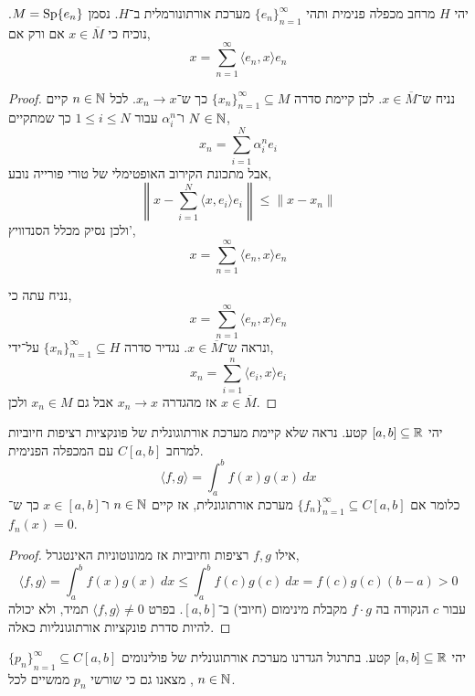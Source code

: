 \question{}
יהי $H$ מרחב מכפלה פנימית ותהי ${\{ e_n \}}_{n = 1}^\infty$ מערכת אורתונורמלית ב־$H$.
נסמן $M = \operatorname{Sp} \{ e_n \}$.
נוכיח כי $x \in \overline{M}$ אם ורק אם,
\[
	x
	= \sum_{n = 1}^\infty \langle e_n, x \rangle e_n
\]
\begin{proof}
	נניח ש־$x \in \overline{M}$.
	לכן קיימת סדרה ${\{ x_n \}}_{n = 1}^\infty \subseteq M$ כך ש־$x_n \to x$.
	לכל $n \in \mathbb{N}$ קיים $N \in \mathbb{N}$ ו־$\alpha_i^n$ עבור $1 \le i \le N$ כך שמתקיים,
	\[
		x_n
		= \sum_{i = 1}^N \alpha_i^n e_i
	\]
	אבל מתכונת הקירוב האופטימלי של טורי פורייה נובע,
	\[
		\left\lVert x - \sum_{i = 1}^N \langle x, e_i \rangle e_i \right\rVert
		\le \lVert x - x_n \rVert
	\]
	ולכן נסיק מכלל הסנדוויץ',
	\[
		x = \sum_{n = 1}^\infty \langle e_n, x \rangle e_n
	\]

	נניח עתה כי,
	\[
		x = \sum_{n = 1}^\infty \langle e_n, x \rangle e_n
	\]
	ונראה ש־$x \in \overline{M}$.
	נגדיר סדרה ${\{ x_n \}}_{n = 1}^\infty \subseteq H$ על־ידי,
	\[
		x_n = \sum_{i = 1}^n \langle e_i, x \rangle e_i
	\]
	אז מהגדרה $x_n \to x$ אבל גם $x_n \in M$ ולכן $x \in \overline{M}$.
\end{proof}

\question{}
יהי $[a, b] \subseteq \mathbb{R}$ קטע.
נראה שלא קיימת מערכת אורתוגונלית של פונקציות רציפות חיוביות למרחב $C[a, b]$ עם המכפלה הפנימית.
\[
	\langle f, g \rangle
	= \int_{a}^{b} f(x) g(x)\ dx
\]
כלומר אם ${\{ f_n \}}_{n = 1}^\infty \subseteq C[a, b]$ מערכת אורתוגונלית,
אז קיים $n \in \mathbb{N}$ ו־$x \in [a, b]$ כך ש־$f_n(x) = 0$.
\begin{proof}
	אילו $f, g$ רציפות וחיוביות אז ממונוטוניות האינטגרל,
	\[
		\langle f, g \rangle
		= \int_{a}^{b} f(x) g(x)\ dx
		\le \int_{a}^{b} f(c) g(c)\ dx
		= f(c) g(c) (b - a)
		> 0
	\]
	עבור $c$ הנקודה בה $f \cdot g$ מקבלת מינימום (חיובי) ב־$[a, b]$.
	בפרט $\langle f, g \rangle \ne 0$ תמיד, ולא יכולה להיות סדרת פונקציות אורתוגונליות כאלה.
\end{proof}

\question{}
יהי $[a, b] \subseteq \mathbb{R}$ קטע.
בתרגול הגדרנו מערכת אורתוגונלית של פולינומים ${\{ p_n \}}_{n = 1}^\infty \subseteq C[a, b]$,
מצאנו גם כי שורשי $p_n$ ממשיים לכל $n \in \mathbb{N}$.

